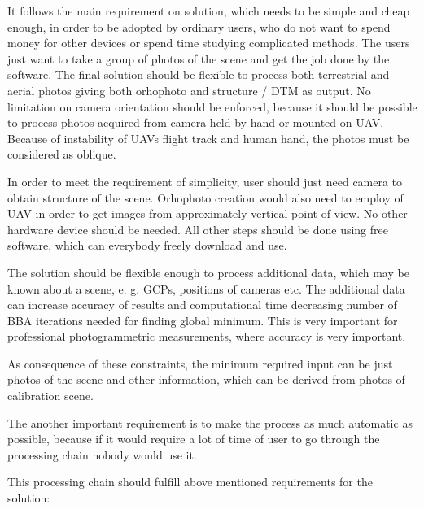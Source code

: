 \documentclass[a4paper,12pt]{article}
\begin{document}
It follows the main requirement 
on solution, which needs to be simple and cheap enough,
in order to be adopted by
ordinary users, who do not want 
to spend money for other devices or spend time studying complicated methods. 
The users just 
want to take a group of photos of the scene and get the job done by the software.
The final solution should be flexible to process both terrestrial and aerial photos
giving both orhophoto and structure / DTM as output. 
No limitation on camera orientation should be enforced, because it should be possible 
to process photos acquired from camera held by hand or mounted on UAV.
Because of instability of UAVs flight track and human hand, the photos 
must be considered as oblique. 

In order to meet the requirement of simplicity, user should just need  
 camera to obtain structure of the scene. Orhophoto creation would also need to employ of UAV
in order to get images from approximately vertical point of view.
No other hardware device should be needed. 
All other steps should be done 
using free software, which can everybody freely download and use. 

The solution should be flexible enough to process additional data, which may be known about a scene, 
e. g. GCPs, positions of cameras etc. The additional data can
 increase accuracy of results and computational time  
 decreasing number of  BBA iterations needed for finding global minimum. This is very important 
 for professional photogrammetric measurements, where accuracy is very important.

As consequence of these constraints, the minimum required input can be just photos
of the scene and other information, which can be derived from photos of calibration scene.

The another important requirement is to make the process as much automatic as possible, because 
if it would require a lot of time of user to go through the processing chain nobody would use it.

This processing chain should fulfill above mentioned requirements for the solution:
\end{document}
